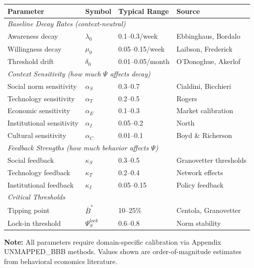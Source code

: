 \begin{tcolorbox}[colback=gray!5!white, colframe=gray!75!black,
    title=\textbf{UNTCM Parameter Summary Table}]
\begin{center}
\renewcommand{\arraystretch}{1.2}
\begin{tabular}{@{}llll@{}}
\toprule
\textbf{Parameter} & \textbf{Symbol} & \textbf{Typical Range} & \textbf{Source} \\
\midrule
\multicolumn{4}{l}{\textit{Baseline Decay Rates (context-neutral)}} \\
Awareness decay & $\lambda_0$ & 0.1--0.3/week & Ebbinghaus, Bordalo \\
Willingness decay & $\mu_0$ & 0.05--0.15/week & Laibson, Frederick \\
Threshold drift & $\delta_0$ & 0.01--0.05/month & O'Donoghue, Akerlof \\
\midrule
\multicolumn{4}{l}{\textit{Context Sensitivity (how much $\Psi$ affects decay)}} \\
Social norm sensitivity & $\alpha_S$ & 0.3--0.7 & Cialdini, Bicchieri \\
Technology sensitivity & $\alpha_T$ & 0.2--0.5 & Rogers \\
Economic sensitivity & $\alpha_E$ & 0.1--0.3 & Market calibration \\
Institutional sensitivity & $\alpha_I$ & 0.05--0.2 & North \\
Cultural sensitivity & $\alpha_C$ & 0.01--0.1 & Boyd \& Richerson \\
\midrule
\multicolumn{4}{l}{\textit{Feedback Strengths (how much behavior affects $\Psi$)}} \\
Social feedback & $\kappa_S$ & 0.3--0.5 & Granovetter thresholds \\
Technology feedback & $\kappa_T$ & 0.2--0.4 & Network effects \\
Institutional feedback & $\kappa_I$ & 0.05--0.15 & Policy feedback \\
\midrule
\multicolumn{4}{l}{\textit{Critical Thresholds}} \\
Tipping point & $\bar{B}^*$ & 10--25\% & Centola, Granovetter \\
Lock-in threshold & $\Psi_S^{lock}$ & 0.6--0.8 & Norm stability \\
\bottomrule
\end{tabular}
\end{center}

\textbf{Note:} All parameters require domain-specific calibration via Appendix UNMAPPED_BBB methods. Values shown are order-of-magnitude estimates from behavioral economics literature.

\end{tcolorbox}

